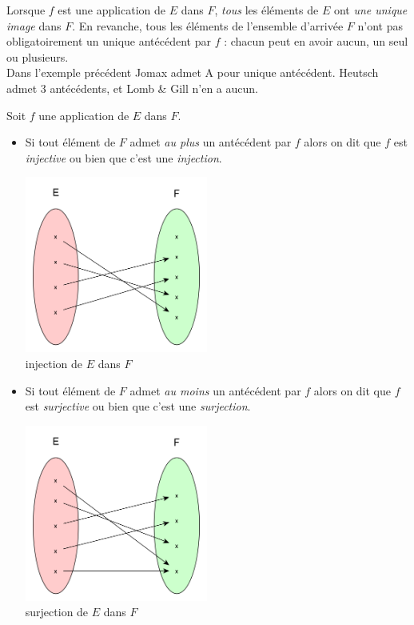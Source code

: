 \begin{remarque}[]
    Lorsque $f$ est une application de $E$ dans $F$, \textit{tous} les éléments de $E$ ont \textit{une unique image} dans $F$. En revanche, tous les éléments de l'ensemble d'arrivée $F$ n'ont pas obligatoirement un unique antécédent par $f$ : chacun peut en avoir aucun, un seul ou plusieurs.\\
    Dans l'exemple précédent Jomax admet A pour unique antécédent. Heutsch admet 3 antécédents, et Lomb \& Gill n'en a aucun.
\end{remarque}

\begin{definition}
    Soit $f$ une application de $E$ dans $F$.
    \begin{itemize}
        \item 	Si tout élément de $F$ admet \textit{au plus} un antécédent par $f$ alors on dit que $f$ est \textit{injective} ou bien que c'est une \textit{injection}.
              \begin{center}
                  \includegraphics[width=6cm]{ensembles/img/ex_inj.png}\\ {\footnotesize injection de $E$ dans $F$}
              \end{center}
        \item 	Si tout élément de $F$ admet \textit{au moins} un antécédent par $f$ alors on dit que $f$ est \textit{surjective} ou bien que c'est une \textit{surjection}.
              \begin{center}
                  \includegraphics[width=6cm]{ensembles/img/ex_surj.png}\\ {\footnotesize surjection de $E$ dans $F$}

\end{center}
\end{itemize}
\end{definition}
